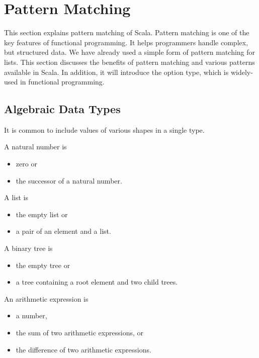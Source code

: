 \setchapterpreamble[u]{\margintoc}
\chapter{Pattern Matching}

This section explains pattern matching of Scala.
Pattern matching is one of the key features of functional programming.
It helps programmers handle complex, but structured data.
We have already used a simple form of pattern matching for lists.
This section discusses the benefits
of pattern matching and various patterns available in Scala.
In addition, it will introduce the option type, which is widely-used in
functional programming.

\section{Algebraic Data Types}

It is common to include values of various shapes in a single type.

A natural number is

\begin{itemize}
\item zero or
\item the successor of a natural number.
\end{itemize}

A list is

\begin{itemize}
\item the empty list or
\item a pair of an element and a list.
\end{itemize}

A binary tree is

\begin{itemize}
\item the empty tree or
\item a tree containing a root element and two child trees.
\end{itemize}

An arithmetic expression is

\begin{itemize}
\item a number,
\item the sum of two arithmetic expressions, or
\item the difference of two arithmetic expressions.
\end{itemize}

